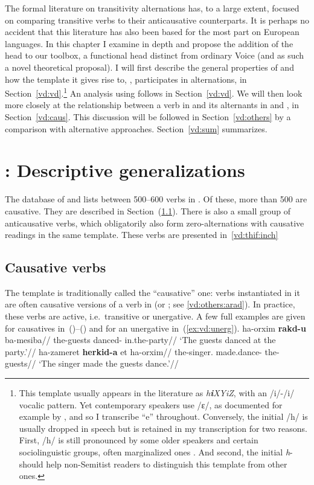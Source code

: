 The formal literature on transitivity alternations has, to a large extent, focused on comparing transitive verbs to their anticausative counterparts. It is perhaps no accident that this literature has also been based for the most part on European languages. In this chapter I examine {\thit} in depth and propose the addition of the head {\vd} to our toolbox, a functional head distinct from ordinary Voice (and as such a novel theoretical proposal). I will first describe the general properties of {\vd} and how the template it gives rise to, {\thif}, participates in alternations, in Section~\ref{vd:vd}.\footnote{This template usually appears in the literature as \emph{h\textbf{i}XYiZ}, with an /i/-/i/ vocalic pattern. Yet contemporary speakers use /ɛ/, as documented for example by \cite{trachtman16}, and so I transcribe ``e'' throughout. Conversely, the initial /h/ is usually dropped in speech but is retained in my transcription for two reasons. First, /h/ is still pronounced by some older speakers and certain sociolinguistic groups, often marginalized ones \citep[cf.~][]{schwarzwald81biu,gafter14phd}. And second, the initial \emph{h}- should help non-Semitist readers to distinguish this template from other ones.} An analysis using {\vd} follows in Section~\ref{vd:vd}. We will then look more closely at the relationship between a verb in {\tkal} and its alternants in {\tnif} and {\thif}, in Section~\ref{vd:caus}. This discussion will be followed in Section~\ref{vd:others} by a comparison with alternative approaches. Section~\ref{vd:sum} summarizes.


\section{\thif: Descriptive generalizations} \label{vd:thif}
The database of \cite{ehrenfeld12} and \cite{ahdout19phd} lists between 500--600 verbs in {\thif}. Of these, more than 500 are causative. They are described in Section~(\ref{vd:thif:caus}). There is also a small group of anticausative verbs, which obligatorily also form zero-alternations with causative readings in the same template. These verbs are presented in~\ref{vd:thif:inch}

	\subsection{Causative verbs} \label{vd:thif:caus}
The template {\thif} is traditionally called the ``causative'' one: verbs instantiated in it are often causative versions of a verb in {\tkal} (or {\tnif}; see \ref{vd:others:arad}). In practice, these verbs are active, i.e.~transitive or unergative. A few full examples are given for causatives in~(\nextx)--(\anextx) and for an unergative in~(\ref{ex:vd:unerg}).
\pex
	\a \begingl
		\gla ha-orxim \textbf{rakd-u} ba-mesiba//
		\glb the-guests danced- in.the-party//
		\glft `The guests danced at the party.'//
	\endgl
	\a \begingl
		\gla ha-zameret \textbf{herkid-a} et ha-orxim//
		\glb the-singer. made.dance-  the-guests//
		\glft `The singer made the guests dance.'//
	\endgl
\xe

